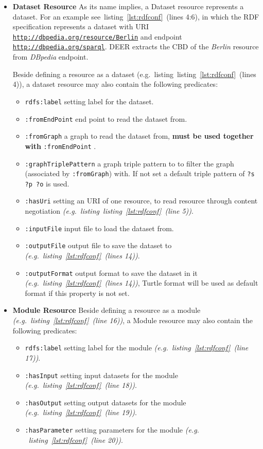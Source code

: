 \documentclass[a4paper,twoside,bibtotoc,abstracton,12pt,BCOR=15mm]{article}
\newcommand{\geolift}{\textsc{DEER}\xspace}
\begin{document}
\begin{itemize}
 \item \textbf{Dataset Resource}
    As its name implies, a Dataset resource represents a dataset. 
    For an example see~listing~\ref{lst:rdfconf}~(lines 4:6), in which the RDF specification represents a dataset with URI \texttt{\url{http://dbpedia.org/resource/Berlin}} and endpoint \texttt{\url{http://dbpedia.org/sparql}}.
    \geolift extracts the CBD of the \emph{Berlin} resource from \emph{DBpedia} endpoint. 

    Beside defining a resource as a dataset (e.g.~listing~listing~\ref{lst:rdfconf}~(lines 4)),
    a dataset resource may also contain the following predicates:
    \begin{itemize}
	\item \texttt{rdfs:label} setting label for the dataset.
	\item \texttt{:fromEndPoint} end point to read the dataset from. 
	\item \texttt{:fromGraph} a graph to read the dataset from, \textbf{must be used together with} \texttt{:fromEndPoint} . 
	\item \texttt{:graphTriplePattern} a graph triple pattern to to filter the graph (associated by \texttt{:fromGraph}) with. If not set a default triple pattern of \texttt{?s ?p ?o} is used.
	\item \texttt{:hasUri} setting an URI of one resource, to read resource through content negotiation \emph{(e.g.~listing~listing~\ref{lst:rdfconf}~(line 5))}.
	\item \texttt{:inputFile} input file to load the dataset from.
	\item \texttt{:outputFile} output file to save the dataset to \emph{(e.g.~listing~\ref{lst:rdfconf}~(lines 14))}.
	\item \texttt{:outputFormat} output format to save the dataset in it \emph{(e.g.~listing~\ref{lst:rdfconf}~(lines 14))}, Turtle format will be used as default format if this property is not set.
    \end{itemize}

  \item \textbf{Module Resource}
    Beside defining a resource as a module \emph{(e.g.~listing~\ref{lst:rdfconf}~(line 16))},
    a Module resource may also contain the following predicates:
    \begin{itemize}
	\item \texttt{rdfs:label} setting label for the module \emph{(e.g.~listing~\ref{lst:rdfconf}~(line 17))}.
	\item \texttt{:hasInput} setting input datasets for the module \emph{(e.g.~listing~\ref{lst:rdfconf}~(line 18))}.
	\item \texttt{:hasOutput} setting output datasets for the module \emph{(e.g.~listing~\ref{lst:rdfconf}~(line 19))}.
	\item \texttt{:hasParameter} setting parameters for the module \emph{(e.g. ~listing~\ref{lst:rdfconf}~(line 20))}.
    \end{itemize}


\end{itemize}
\end{document}

